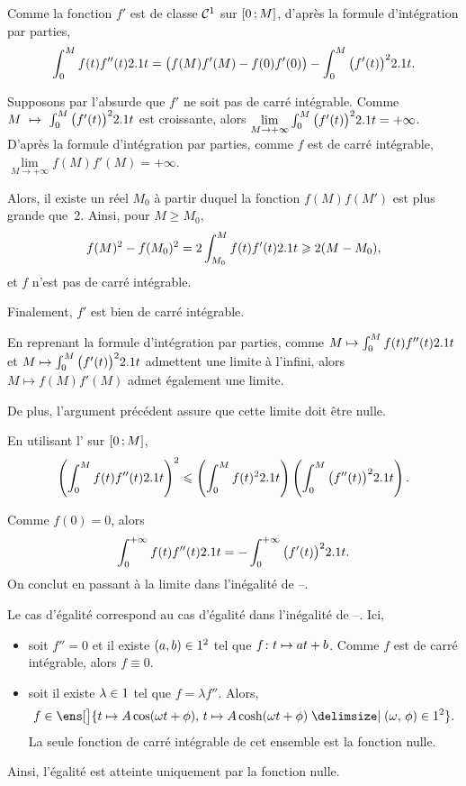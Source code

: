 \begin{solution}
\begin{reponses}
\item Comme la fonction $f'$ est de classe $\Cont^1$ sur $\interff{0}{M}$, d'après la formule d'intégration par parties,
\[
\int_0^M f(t) f''(t) \d t = \big(f(M) f'(M) - f(0) f'(0)\big) - \int_0^M \big(f'(t)\big)^2 \d t.
\]

\item Supposons par l'absurde que $f'$ ne soit pas de carré intégrable. Comme $M~\mapsto~\int_0^M \big(f'(t)\big)^2 \d t$ est croissante, alors $\lim\limits_{M\to+\infty} \int_0^M \big(f'(t)\big)^2 \d t = +\infty$. D'après la formule d'intégration par parties, comme $f$ est de carré intégrable, $\lim\limits_{M\to+\infty} f(M) f'(M) = +\infty$.

Alors, il existe un réel $M_0$ à partir duquel la fonction $f(M) f(M')$ est plus grande que~$2$. Ainsi, pour $M \geqslant M_0$,
\[
f(M)^2 - f(M_0)^2 = 2 \int_{M_0}^M f(t) f'(t) \d t \geqslant 2 (M - M_0),
\]
et $f$ n'est pas de carré intégrable.

Finalement, $f'$ est bien de carré intégrable.

\item En reprenant la formule d'intégration par parties, comme $M \mapsto \int_0^M f(t) f''(t) \d t$ et $M \mapsto \int_0^M \big(f'(t)\big)^2 \d t$ admettent une limite à l'infini, alors $M \mapsto f(M) f'(M)$ admet également une limite.

De plus, l'argument précédent assure que cette limite doit être nulle.

\item En utilisant l' sur $\interff{0}{M}$,
\[
\left(\int_0^M f(t) f''(t) \d t\right)^2 \leqslant \left(\int_0^M f(t)^2 \d t\right) \left( \int_0^M \big(f''(t)\big)^2 \d t \right).
\]

\item Comme $f(0) = 0$, alors
\[
\int_0^{+\infty} f(t) f''(t) \d t = - \int_0^{+\infty} \big(f'(t)\big)^2 \d t.
\]
On conclut en passant à la limite dans l'inégalité de --.
\end{reponses}
\end{solution}

\begin{remarque}
Le cas d'égalité correspond au cas d'égalité dans l'inégalité de --. Ici,
\begin{itemize}
\item soit $f'' = 0$ et il existe $(a, b) \in \R^2$ tel que $\fonctionligne[f]{t}{a t + b}$. Comme $f$ est de carré intégrable, alors $f \equiv 0$.

\item soit il existe $\lambda \in \R$ tel que $f = \lambda f''$. Alors,
\[
f \in \ens[\big]{t \mapsto A \cos(\omega t + \phi),\, t \mapsto A \cosh(\omega t + \phi) \tq (\omega,\, \phi) \in \R^2}.
\]
La seule fonction de carré intégrable de cet ensemble est la fonction nulle.
\end{itemize}
Ainsi, l'égalité est atteinte uniquement par la fonction nulle.
\end{remarque}

